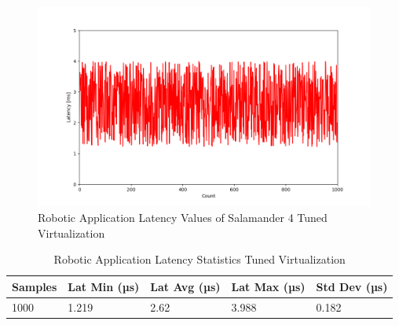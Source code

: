 \documentclass[MMR,Master,english]{twbook}
\begin{document}
\begin{figure}[H]
	\centering
	\includegraphics[width=1.0\columnwidth]{masterthesis-documentation/docs/resources/scripts/experiment/generated_latencies/tuned_virt_latencies.png}
	\caption[Robotic Application Latency Values of Salamander 4 Tuned Virtualization]{Robotic Application Latency Values of Salamander 4 Tuned Virtualization}
	\label{fig:tuned_virt_latencies}
\end{figure}
\begin{table}[H]
	\centering
	\caption{Robotic Application Latency Statistics Tuned Virtualization}
	\label{tab:robotic_application_latency_values_virt_tun}
	\setlength{\tabcolsep}{0.5em} %
	{\renewcommand{\arraystretch}{1.2}%
		\begin{tabular}{|l|l|l|l|l|}
			\hline
			\textbf{Samples} & \textbf{Lat Min (µs)} & \textbf{Lat Avg (µs)} & \textbf{Lat Max (µs)} & \textbf{Std Dev (µs)} \\ \hline
			1000             & 1.219                 & 2.62                  & 3.988            & 0.182                   \\ \hline
		\end{tabular}}
\end{table}

\clearpage
\end{document}
